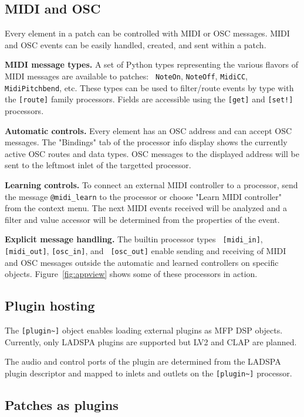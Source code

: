 \documentclass[a4paper]{article}
\begin{document}
\subsection{MIDI and OSC}

Every element in a patch can be controlled with MIDI or OSC
messages.  MIDI and OSC events can be easily handled, created,
and sent within a patch.

{\bf MIDI message types.} A set of Python types representing the
various flavors of MIDI messages are available to patches: {\tt
NoteOn}, {\tt NoteOff}, {\tt MidiCC}, {\tt MidiPitchbend}, etc.
These types can be used to filter/route events by type with the
{\tt [route]} family processors. Fields are accessible using the
{\tt [get]} and {\tt [set!]} processors.

{\bf Automatic controls.} Every element has an OSC address and
can accept OSC messages. The "Bindings" tab of the processor info
display shows the currently active OSC routes and data types. OSC
messages to the displayed address will be sent to the leftmost
inlet of the targetted processor.

{\bf Learning controls.} To connect an external MIDI controller to
a processor, send the message {\tt @midi\_learn} to the processor or
choose "Learn MIDI controller" from the context menu.
The next MIDI events received will be analyzed and a filter and
value accessor will be determined from the properties of the event.

{\bf Explicit message handling.} The builtin processor types {\tt
[midi\_in]}, {\tt [midi\_out]}, {\tt [osc\_in]}, and {\tt
[osc\_out]} enable sending and receiving of MIDI and OSC messages
outside the automatic and learned controllers on specific
objects. Figure~\ref{fig:appview} shows some of these processors
in action.


\subsection{Plugin hosting}

The {\tt [plugin\textasciitilde]} object enables loading external
plugins as MFP DSP objects. Currently, only LADSPA plugins are
supported but LV2 and CLAP are planned.

The audio and control ports of the plugin are determined from the
LADSPA plugin descriptor and mapped to inlets and outlets on the
{\tt [plugin\textasciitilde]} processor.


\subsection{Patches as plugins}
\end{document}
